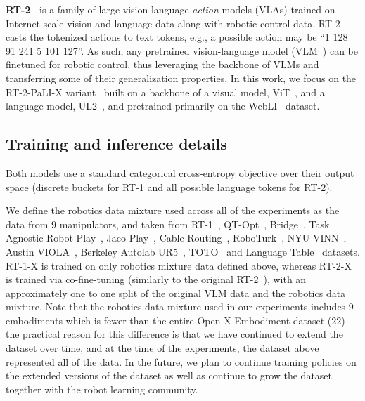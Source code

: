 \documentclass[letterpaper, 10 pt, conference]{ieeeconf}  %
\newcommand{\repo}{Open X-Embodiment\xspace}     %
\newcommand{\numembodiment}{22}
\newcommand{\numembodimentusedintraining}{9}
\newcommand{\nummanipulatorusedintraining}{9}
\begin{document}
\textbf{RT-2~\cite{brohan2023rt2}} is a family of large vision-language-\textit{action} models (VLAs) trained on Internet-scale vision and language data along with robotic control data. 
RT-2 casts the tokenized actions to text tokens, e.g., a possible action may be ``1 128 91 241 5 101 127''. 
As such, any pretrained vision-language model (VLM~\cite{chen2023palix, alayrac2022flamingo, driess2023palme}) can be finetuned for robotic control, thus leveraging the backbone of VLMs and transferring some of their generalization properties.
In this work, we focus on the RT-2-PaLI-X variant~\cite{chen2023palix} built on a backbone of a visual model, ViT~\cite{dosovitskiy2021image}, and a language model, UL2~\cite{tay2023ul2}, and pretrained primarily on the WebLI~\cite{chen2023palix} dataset.

\vspace{-0.1em}
\subsection{Training and inference details}
\vspace{-0.1em}
\label{sec:training_details}

Both models use a standard categorical cross-entropy objective over their output space (discrete buckets for RT-1 and all possible language tokens for RT-2). 

We define the robotics data mixture used across all of the experiments as the data from $\nummanipulatorusedintraining$ manipulators, and taken from RT-1~\cite{brohan2023rt1}, QT-Opt~\cite{kalashnikov2018qt}, Bridge~\cite{walke2023bridgedata}, Task Agnostic Robot Play~\cite{rosetebeas2022latent, mees2023grounding}, Jaco Play~\cite{dass2023jacoplay}, Cable Routing~\cite{luo2023multistage}, RoboTurk~\cite{DBLP:journals/corr/abs-1811-02790}, NYU VINN~\cite{pari2021surprising}, Austin VIOLA~\cite{zhu2023viola}, Berkeley Autolab UR5~\cite{BerkeleyUR5Website}, TOTO~\cite{zhou2023train} and Language Table~\cite{lynch2023interactive} datasets.
RT-1-X is trained on only robotics mixture data defined above, whereas RT-2-X is trained via co-fine-tuning (similarly to the original RT-2~\cite{brohan2023rt2}), with an approximately one to one split of the original VLM data and the robotics data mixture.
Note that the robotics data mixture used in our experiments includes $\numembodimentusedintraining$ embodiments which is fewer than the entire \repo dataset ($\numembodiment$) -- the practical reason for this difference is that we have continued to extend the dataset over time, and at the time of the experiments, the dataset above represented all of the data. In the future, we plan to continue training policies on the extended versions of the dataset as well as continue to grow the dataset together with the robot learning community.
\end{document}
